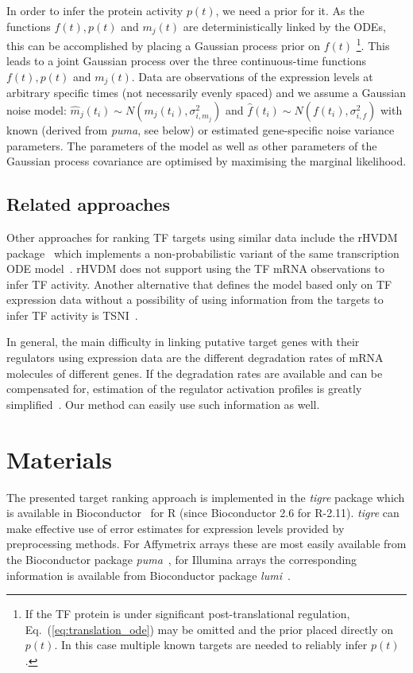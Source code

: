\documentclass[11pt]{article}
\newcommand{\Rpackage}[1]{\emph{#1}}
\newcommand{\tigre}[0]{\Rpackage{tigre}}
\begin{document}
In order to infer the protein activity $p(t)$, we need a prior for it.
As the functions $f(t), p(t)$ and $m_j(t)$ are deterministically
linked by the ODEs, this can be accomplished by placing a Gaussian
process prior on $f(t)$ \footnote{If the TF protein is under
  significant post-translational regulation,
  Eq.~(\ref{eq:translation_ode}) may be omitted and the prior placed
  directly on $p(t)$.  In this case multiple known targets are needed
  to reliably infer $p(t)$.}.
This leads to a joint Gaussian process over the three continuous-time
functions $f(t),p(t)$ and $m_j(t)$.  Data are observations of the
expression levels at arbitrary specific times (not necessarily evenly
spaced) and we assume a Gaussian noise model: $\hat{m}_j(t_i) \sim
N(m_j(t_i),\sigma_{i,m_j}^2)$ and $\hat{f}(t_i) \sim
N(f(t_i),\sigma_{i,f}^2)$ with known (derived from \emph{puma}, see
below) or estimated gene-specific noise variance parameters. The
parameters of the model as well as other parameters of the Gaussian
process covariance are optimised by maximising the marginal
likelihood.

\subsection{Related approaches}

Other approaches for ranking TF targets using similar data include the
rHVDM package~\cite{Barenco2009} which implements a non-probabilistic
variant of the same transcription ODE model~\cite{Barenco2006a}.
rHVDM does not support using the TF mRNA observations to infer TF
activity.  Another alternative that defines the model based only on
TF expression data without a possibility of using information from the
targets to infer TF activity is TSNI~\cite{Gatta2008}.

In general, the main difficulty in linking putative target genes with
their regulators using expression data are the different degradation
rates of mRNA molecules of different genes.  If the degradation rates
are available and can be compensated for, estimation of the regulator
activation profiles is greatly simplified~\cite{Barenco2009a}.  Our
method can easily use such information as well.

\section{Materials}

The presented target ranking approach is implemented in the \tigre{}
package which is available in Bioconductor~\cite{Gentleman2004} for R
(since Bioconductor 2.6 for R-2.11).  \tigre{} can make effective use
of error estimates for expression levels provided by preprocessing
methods.  For Affymetrix arrays these are most easily available from
the Bioconductor package \Rpackage{puma}~\cite{Pearson2009}, for
Illumina arrays the corresponding information is available from
Bioconductor package \Rpackage{lumi}~\cite{Du2008}.
\end{document}
